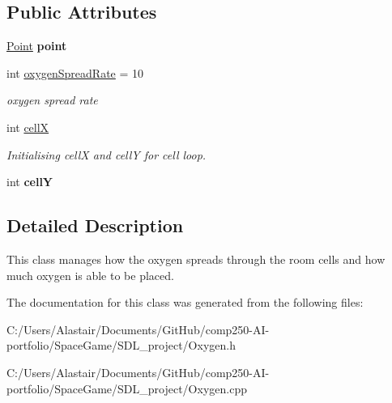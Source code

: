 \subsection*{Public Attributes}
\begin{DoxyCompactItemize}
\item 
\mbox{\label{class_oxygen_ac187545007ac0a6250aa22911a9e99cd}} 
\hyperlink{class_point}{Point} {\bfseries point}
\item 
\mbox{\label{class_oxygen_a2bd23b48e83052778acfdd0ddc49eefa}} 
int \hyperlink{class_oxygen_a2bd23b48e83052778acfdd0ddc49eefa}{oxygen\+Spread\+Rate} = 10
\begin{DoxyCompactList}\small\item\em oxygen spread rate \end{DoxyCompactList}\item 
\mbox{\label{class_oxygen_aa0447b2be5aa10a55ab258470dc62fa0}} 
int \hyperlink{class_oxygen_aa0447b2be5aa10a55ab258470dc62fa0}{cellX}
\begin{DoxyCompactList}\small\item\em Initialising cellX and cellY for cell loop. \end{DoxyCompactList}\item 
\mbox{\label{class_oxygen_a805797dd4e99fa85688d1f83611958d0}} 
int {\bfseries cellY}
\end{DoxyCompactItemize}


\subsection{Detailed Description}
This class manages how the oxygen spreads through the room cells and how much oxygen is able to be placed. 

The documentation for this class was generated from the following files\+:\begin{DoxyCompactItemize}
\item 
C\+:/\+Users/\+Alastair/\+Documents/\+Git\+Hub/comp250-\/\+A\+I-\/portfolio/\+Space\+Game/\+S\+D\+L\+\_\+project/Oxygen.\+h\item 
C\+:/\+Users/\+Alastair/\+Documents/\+Git\+Hub/comp250-\/\+A\+I-\/portfolio/\+Space\+Game/\+S\+D\+L\+\_\+project/Oxygen.\+cpp\end{DoxyCompactItemize}
